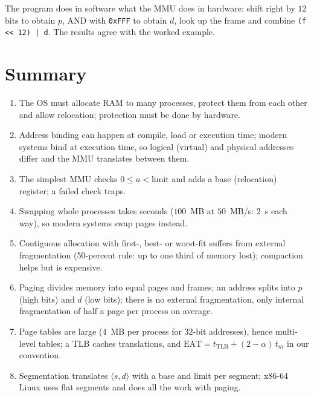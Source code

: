 \documentclass[11pt,a4paper]{article}
\begin{document}
The program does in software what the MMU does in hardware: shift right by $12$ bits to obtain $p$, AND with \texttt{0xFFF} to obtain $d$, look up the frame and combine \texttt{(f << 12) | d}. The results agree with the worked example.

\section{Summary}

\begin{keyidea}
\begin{enumerate}[leftmargin=1.4em]
  \item The OS must allocate RAM to many processes, protect them from each other and allow relocation; protection must be done by hardware.
  \item Address binding can happen at compile, load or execution time; modern systems bind at execution time, so logical (virtual) and physical addresses differ and the MMU translates between them.
  \item The simplest MMU checks $0 \le a < \text{limit}$ and adds a base (relocation) register; a failed check traps.
  \item Swapping whole processes takes seconds ($100$~MB at $50$~MB/s: $2$~s each way), so modern systems swap pages instead.
  \item Contiguous allocation with first-, best- or worst-fit suffers from external fragmentation (50-percent rule: up to one third of memory lost); compaction helps but is expensive.
  \item Paging divides memory into equal pages and frames; an address splits into $p$ (high bits) and $d$ (low bits); there is no external fragmentation, only internal fragmentation of half a page per process on average.
  \item Page tables are large ($4$~MB per process for $32$-bit addresses), hence multi-level tables; a TLB caches translations, and $\text{EAT} = t_{\text{TLB}} + (2-\alpha)\,t_{m}$ in our convention.
  \item Segmentation translates $\langle s, d\rangle$ with a base and limit per segment; x86-64 Linux uses flat segments and does all the work with paging.
\end{enumerate}
\end{keyidea}

\end{document}
